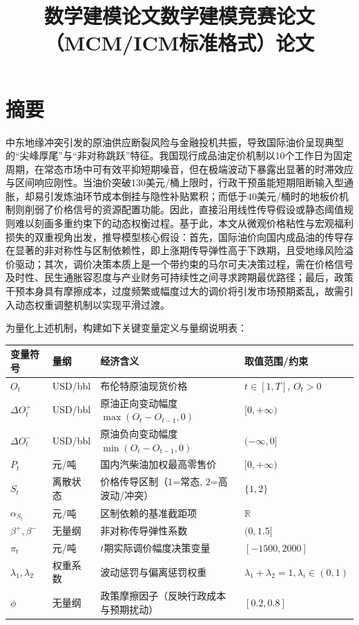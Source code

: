 \documentclass{mcmthesis}
\title{数学建模论文}
\begin{document}
\maketitle

\title{数学建模竞赛论文（MCM/ICM标准格式）论文}

\section{ 摘要}

中东地缘冲突引发的原油供应断裂风险与金融投机共振，导致国际油价呈现典型的“尖峰厚尾”与“非对称跳跃”特征。我国现行成品油定价机制以10个工作日为固定周期，在常态市场中可有效平抑短期噪音，但在极端波动下暴露出显著的时滞效应与区间响应刚性。当油价突破130美元/桶上限时，行政干预虽能短期阻断输入型通胀，却易引发炼油环节成本倒挂与隐性补贴累积；而低于40美元/桶时的地板价机制则削弱了价格信号的资源配置功能。因此，直接沿用线性传导假设或静态阈值规则难以刻画多重约束下的动态权衡过程。基于此，本文从微观价格粘性与宏观福利损失的双重视角出发，推导模型核心假设：首先，国际油价向国内成品油的传导存在显著的非对称性与区制依赖性，即上涨期传导弹性高于下跌期，且受地缘风险溢价驱动；其次，调价决策本质上是一个带约束的马尔可夫决策过程，需在价格信号及时性、民生通胀容忍度与产业财务可持续性之间寻求跨期最优路径；最后，政策干预本身具有摩擦成本，过度频繁或幅度过大的调价将引发市场预期紊乱，故需引入动态权重调整机制以实现平滑过渡。

为量化上述机制，构建如下关键变量定义与量纲说明表：
\begin{table}[htbp]
\centering
\begin{tabular}{l l l l}
\toprule
变量符号 & 量纲 & 经济含义 & 取值范围/约束 \\
\midrule
$O_t$ & USD/bbl & 布伦特原油现货价格 & $t \in [1, T]$, $O_t > 0$ \\
$\Delta O_t^+$ & USD/bbl & 原油正向变动幅度 $\max(O_t - O_{t-1}, 0)$ & $[0, +\infty)$ \\
$\Delta O_t^-$ & USD/bbl & 原油负向变动幅度 $\min(O_t - O_{t-1}, 0)$ & $(-\infty, 0]$ \\
$P_t$ & 元/吨 & 国内汽柴油加权最高零售价 & $[0, +\infty)$ \\
$S_t$ & 离散状态 & 价格传导区制（$1$=常态, $2$=高波动/冲突） & $\{1, 2\}$ \\
$\alpha_{S_t}$ & 元/吨 & 区制依赖的基准截距项 & $\mathbb{R}$ \\
$\beta^+, \beta^-$ & 无量纲 & 非对称传导弹性系数 & $(0, 1.5]$ \\
$\pi_t$ & 元/吨 & $t$期实际调价幅度决策变量 & $[-1500, 2000]$ \\
$\lambda_1, \lambda_2$ & 权重系数 & 波动惩罚与偏离惩罚权重 & $\lambda_1+\lambda_2=1, \lambda_i \in (0,1)$ \\
$\phi$ & 无量纲 & 政策摩擦因子（反映行政成本与预期扰动） & $[0.2, 0.8]$ \\
\bottomrule
\end{tabular}
\end{table}
\end{document}
